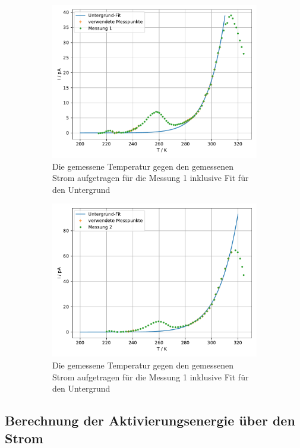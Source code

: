 \begin{figure}
  \label{fig:Untergrund}
  \centering
  \begin{subfigure}[b]{0.75\textwidth}
      \centering
      \includegraphics[width=\textwidth]{build_j/untergrund_1.pdf}
      \caption{Die gemessene Temperatur gegen den gemessenen Strom aufgetragen für die Messung 1 inklusive Fit für den Untergrund}
  \end{subfigure}
  \hfill
  \begin{subfigure}[b]{0.75\textwidth}
      \centering
      \includegraphics[width=\textwidth]{build_j/untergrund_2.pdf}
      \caption{Die gemessene Temperatur gegen den gemessenen Strom aufgetragen für die Messung 1 inklusive Fit für den Untergrund}
  \end{subfigure}
  \caption{}
\end{figure}

\subsection{Berechnung der Aktivierungsenergie über den Strom}


